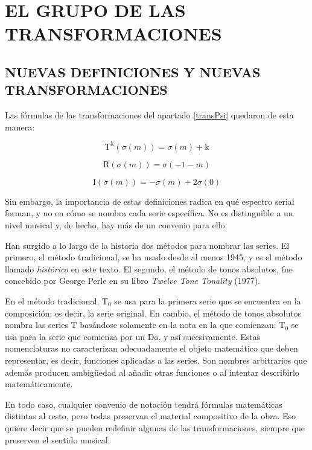 \chapter{EL GRUPO DE LAS TRANSFORMACIONES}
	\section{NUEVAS DEFINICIONES Y NUEVAS TRANSFORMACIONES}
		\label{ciclico}
		Las fórmulas de las transformaciones del apartado \ref{transPsi} quedaron de esta manera:
		\vspace{-0.9cm}
		\begin{multicols}{3}
			$$\text{T}^\text{k}(\sigma(m)) = \sigma(m) + \text{k}$$
			
			$$\text{R}(\sigma(m)) = \sigma(-1-m)$$
			
			$$\text{I}(\sigma(m)) = -\sigma(m) + 2\sigma(0)$$
		\end{multicols} \vspace{-0.3cm}
		
		Sin embargo, la importancia de estas definiciones radica en qué espectro serial forman, y no en cómo se nombra cada serie específica. No es distinguible a un nivel musical y, de hecho, hay más de un convenio para ello.
		
		Han surgido a lo largo de la historia dos métodos para nombrar las series. El primero, el método tradicional, se ha usado desde al menos 1945, y es el método llamado \textit{histórico} en este texto. El segundo, el método de tonos absolutos, fue concebido por George Perle en su libro \emph{Twelve Tone Tonality} (1977).
		
		En el método tradicional, T$_0$ se usa para la primera serie que se encuentra en la composición; es decir, la serie original. En cambio, el método de tonos absolutos nombra las series T basándose solamente en la nota en la que comienzan: T$_0$ se usa para la serie que comienza por un Do, y así sucesivamente. Estas nomenclaturas no caracterizan adecuadamente el objeto matemático que deben representar, es decir, funciones aplicadas a las series. Son nombres arbitrarios que además producen ambigüedad al añadir otras funciones o al intentar describirlo matemáticamente.
		
		En todo caso, cualquier convenio de notación tendrá fórmulas matemáticas distintas al resto, pero todas preservan el material compositivo de la obra. Eso quiere decir que se pueden redefinir algunas de las transformaciones, siempre que preserven el sentido musical. 
		
